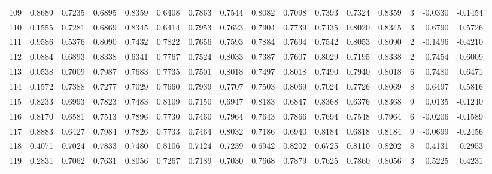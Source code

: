 \begin{tabular}{lrrrrrrrrrrrrrrr}
109 &      0.8689 &  0.7235 &  0.6895 &  0.8359 &  0.6408 &  0.7863 &  0.7544 &  0.8082 &  0.7098 &  0.7393 &   0.7324 &     0.8359 &      3 &                   -0.0330 &                    -0.1454 \\
110 &      0.1555 &  0.7281 &  0.6869 &  0.8345 &  0.6414 &  0.7953 &  0.7623 &  0.7904 &  0.7739 &  0.7435 &   0.8020 &     0.8345 &      3 &                    0.6790 &                     0.5726 \\
111 &      0.9586 &  0.5376 &  0.8090 &  0.7432 &  0.7822 &  0.7656 &  0.7593 &  0.7884 &  0.7694 &  0.7542 &   0.8053 &     0.8090 &      2 &                   -0.1496 &                    -0.4210 \\
112 &      0.0884 &  0.6893 &  0.8338 &  0.6341 &  0.7767 &  0.7524 &  0.8033 &  0.7387 &  0.7607 &  0.8029 &   0.7195 &     0.8338 &      2 &                    0.7454 &                     0.6009 \\
113 &      0.0538 &  0.7009 &  0.7987 &  0.7683 &  0.7735 &  0.7501 &  0.8018 &  0.7497 &  0.8018 &  0.7490 &   0.7940 &     0.8018 &      6 &                    0.7480 &                     0.6471 \\
114 &      0.1572 &  0.7388 &  0.7277 &  0.7029 &  0.7660 &  0.7939 &  0.7707 &  0.7503 &  0.8069 &  0.7024 &   0.7726 &     0.8069 &      8 &                    0.6497 &                     0.5816 \\
115 &      0.8233 &  0.6993 &  0.7823 &  0.7483 &  0.8109 &  0.7150 &  0.6947 &  0.8183 &  0.6847 &  0.8368 &   0.6376 &     0.8368 &      9 &                    0.0135 &                    -0.1240 \\
116 &      0.8170 &  0.6581 &  0.7513 &  0.7896 &  0.7730 &  0.7460 &  0.7964 &  0.7643 &  0.7866 &  0.7694 &   0.7548 &     0.7964 &      6 &                   -0.0206 &                    -0.1589 \\
117 &      0.8883 &  0.6427 &  0.7984 &  0.7826 &  0.7733 &  0.7464 &  0.8032 &  0.7186 &  0.6940 &  0.8184 &   0.6818 &     0.8184 &      9 &                   -0.0699 &                    -0.2456 \\
118 &      0.4071 &  0.7024 &  0.7833 &  0.7480 &  0.8106 &  0.7124 &  0.7239 &  0.6942 &  0.8202 &  0.6725 &   0.8110 &     0.8202 &      8 &                    0.4131 &                     0.2953 \\
119 &      0.2831 &  0.7062 &  0.7631 &  0.8056 &  0.7267 &  0.7189 &  0.7030 &  0.7668 &  0.7879 &  0.7625 &   0.7860 &     0.8056 &      3 &                    0.5225 &                     0.4231 \\

\end{tabular}

